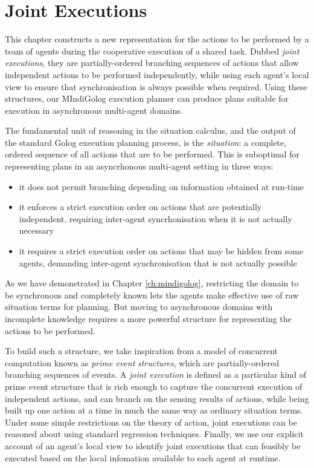 

\chapter{Joint Executions}

\label{ch:jointexec}

This chapter constructs a new representation for the actions to be
performed by a team of agents during the cooperative execution of
a shared task. Dubbed \emph{joint executions}, they are partially-ordered
branching sequences of actions that allow independent actions to be
performed independently, while using each agent's local view to ensure
that synchronisation is always possible when required. Using these
structures, our MIndiGolog execution planner can produce plans suitable
for execution in asynchronous multi-agent domains.

The fundamental unit of reasoning in the situation calculus, and the
output of the standard Golog execution planning process, is the \emph{situation}:
a complete, ordered sequence of all actions that are to be performed.
This is suboptimal for representing plans in an asyncrhonous multi-agent
setting in three ways:

\begin{itemize}
\item it does not permit branching depending on information obtained at
run-time 
\item it enforces a strict execution order on actions that are potentially
independent, requiring inter-agent syncrhonisation when it is not
actually necessary 
\item it requires a strict execution order on actions that may be hidden
from some agents, demanding inter-agent synchronisation that is not
actually possible 
\end{itemize}
As we have demonstrated in Chapter \ref{ch:mindigolog}, restricting
the domain to be synchronous and completely known lets the agents
make effective use of raw situation terms for planning. But moving
to asynchronous domains with incomplete knowledge requires a more
powerful structure for representing the actions to be performed.

To build such a structure, we take inspiration from a model of concurrent
computation known as \emph{prime event} \emph{structures}, which are
partially-ordered branching sequences of events. A \emph{joint execution}
is defined as a particular kind of prime event structure that is rich
enough to capture the concurrent execution of independent actions,
and can branch on the sensing results of actions, while being built
up one action at a time in much the same way as ordinary situation
terms. Under some simple restrictions on the theory of action, joint
executions can be reasoned about using standard regression techniques.
Finally, we use our explicit account of an agent's local view to identify
joint executions that can feasibly be executed based on the local
infomation available to each agent at runtime.

